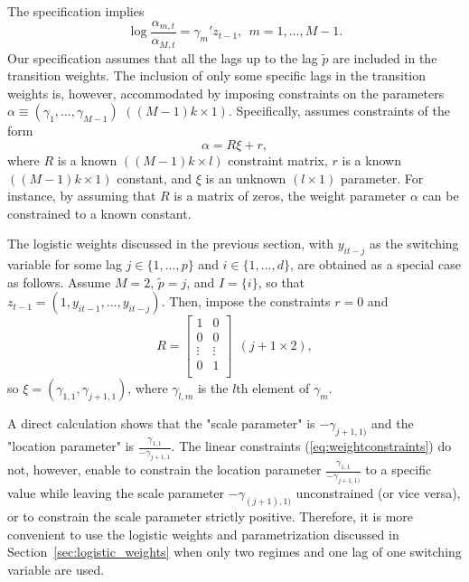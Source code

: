 \documentclass[nojss]{jss}
\begin{document}
The specification implies
\begin{equation}
\log\frac{\alpha_{m,t}}{\alpha_{M,t}}=\gamma_m'z_{t-1}, \ \ m=1,...,M-1.
\end{equation}
Our specification assumes that all the lags up to the lag $\tilde{p}$ are included in the transition weights. The inclusion of only some specific lags in the transition weights is, however, accommodated by imposing constraints on the parameters $\alpha \equiv (\gamma_1,...,\gamma_{M-1})$ $((M-1)k\times 1)$. Specifically,  assumes constraints of the form
\begin{equation}\label{eq:weightconstraints}
\alpha = R\xi + r,
\end{equation}
where $R$ is a known $((M-1)k\times l)$ constraint matrix, $r$ is a known $((M-1)k\times 1)$ constant, and $\xi$ is an unknown $(l \times 1)$ parameter. For instance, by assuming that $R$ is a matrix of zeros, the weight parameter $\alpha$ can be constrained to a known constant.

The logistic weights discussed in the previous section, with $y_{it-j}$ as the switching variable for some lag $j\in \lbrace 1,...,p \rbrace$ and $i\in \lbrace 1,...,d \rbrace$, are obtained as a special case as follows. Assume $M=2$, $\tilde{p}=j$, and $I=\lbrace i\rbrace$, so that $z_{t-1}=(1, y_{it-1},...,y_{it-j})$. Then, impose the constraints $r=0$ and
\begin{equation}
R=
\begin{bmatrix}
1 & 0 \\
0 & 0 \\
\vdots & \vdots \\
0 & 1 \\
\end{bmatrix}
\ \ (j+1 \times 2),
\end{equation}
so $\xi = (\gamma_{1,1},\gamma_{j+1,1})$, where $\gamma_{l,m}$ is the $l$th element of $\gamma_{m}$.

A direct calculation shows that the "scale parameter" is $-\gamma_{j+1,1)}$ and the "location parameter" is $\frac{\gamma_{1,1}}{-\gamma_{j+1,1}}$. The linear constraints (\ref{eq:weightconstraints}) do not, however, enable to constrain the location parameter $\frac{\gamma_{1,1}}{-\gamma_{j+1,1)}}$ to a specific value while leaving the scale parameter $-\gamma_{(j+1),1)}$ unconstrained (or vice versa), or to constrain the scale parameter strictly positive. Therefore, it is more convenient to use the logistic weights and parametrization discussed in Section~\ref{sec:logistic_weights} when only two regimes and one lag of one switching variable are used.
\end{document}
